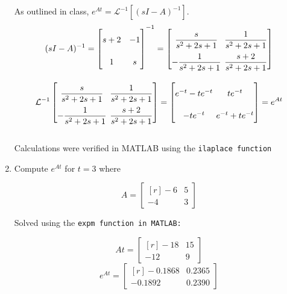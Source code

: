 \documentclass[10pt, oneside, letter]{article}
\begin{document}
\begin{enumerate}
	
	As outlined in class, $e^{At} = \mathcal{L}^{-1}[(sI - A)^{-1}]$. \\
	
	$$(sI - A)^{-1} = 
	\begin{bmatrix*}[c] s + 2 & -1 \\ 1 & s
	\end{bmatrix*}^{-1} = 
	\arraycolsep=2pt\def\arraystretch{2.2}
	\begin{bmatrix*}[c] \dfrac{s}{s^2 + 2s + 1} & \dfrac{1}{s^2 + 2s + 1} \\ -\dfrac{1}{s^2 + 2s + 1} & \dfrac{s + 2}{s^2 + 2s + 1}
	\end{bmatrix*} $$ 
	
	$$\mathcal{L}^{-1}
	\arraycolsep=2pt\def\arraystretch{2.2}
	\begin{bmatrix*}[c] \dfrac{s}{s^2 + 2s + 1} & \dfrac{1}{s^2 + 2s + 1} \\ -\dfrac{1}{s^2 + 2s + 1} & \dfrac{s + 2}{s^2 + 2s + 1}
	\end{bmatrix*} = \begin{bmatrix*}[c]
	e^{-t} -te^{-t} & te^{-t} \\ -te^{-t} & e^{-t} + te^{-t}
	\end{bmatrix*} = e^{At}$$ \\
	 
	Calculations were verified in MATLAB using the \tt ilaplace \rm function \\
	
	\item Compute $e^{At}$ for $t = 3$ where 

	$$A = \begin{bmatrix*}[r] -6 & 5 \\ -4 & 3
	\end{bmatrix*}$$ 
	
	Solved using the \tt expm \rm function in MATLAB:
	
	$$At = \begin{bmatrix*}[r] -18 & 15 \\ -12 & 9
	\end{bmatrix*}$$
	\vspace{2ex}
	$$e^{At} = \begin{bmatrix*}[r] -0.1868 & 0.2365 \\ -0.1892 & 0.2390
	\end{bmatrix*}$$ 
	
	
	\end{enumerate}
\end{document}
